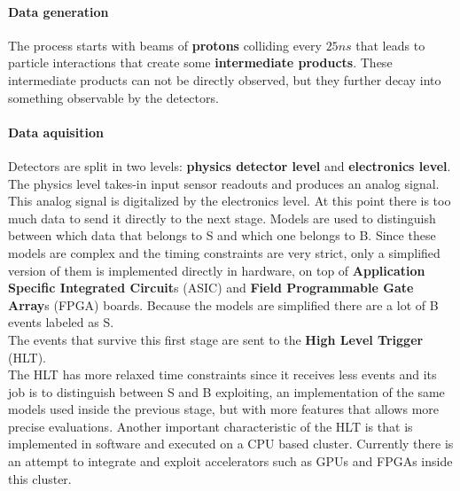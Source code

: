 \paragraph{Data generation}
The process starts with beams of \textbf{protons} colliding every $25ns$ that leads to particle interactions that create some \textbf{intermediate products}. These intermediate products can not be directly observed, but they further decay into something observable by the detectors.
\paragraph{Data aquisition}
Detectors are split in two levels: \textbf{physics detector level} and \textbf{electronics level}. The physics level takes-in input sensor readouts and produces an analog signal. This analog signal is digitalized by the electronics level. At this point there is too much data to send it directly to the next stage. Models are used to distinguish between which data that belongs to S and which one belongs to B. Since these models are complex and the timing constraints are very strict, only a simplified version of them is implemented directly in hardware, on top of \textbf{Application Specific Integrated Circuit}s (ASIC) and \textbf{Field Programmable Gate Array}s (FPGA) boards. Because the models are simplified there are a lot of B events labeled as S. \\
The events that survive this first stage are sent to the \textbf{High Level Trigger} (HLT).\\
The HLT has more relaxed time constraints since it receives less events and its job is to distinguish between S and B exploiting, an implementation of the same models used inside the previous stage, but with more features that allows more precise evaluations. Another important characteristic of the HLT is that is implemented in software and executed on a CPU based cluster. Currently there is an attempt to integrate and exploit accelerators such as GPUs and FPGAs inside this cluster.
